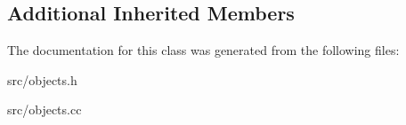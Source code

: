 \subsection*{Additional Inherited Members}


The documentation for this class was generated from the following files\+:\begin{DoxyCompactItemize}
\item 
src/objects.\+h\item 
src/objects.\+cc\end{DoxyCompactItemize}
